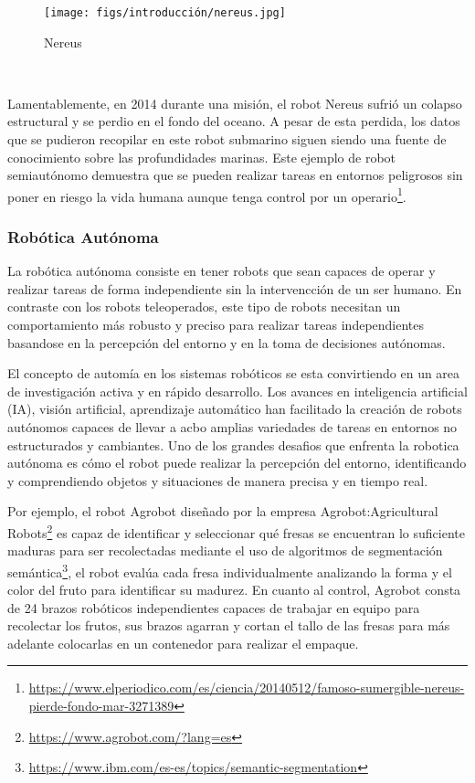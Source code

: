 \begin{figure} [H]
  \begin{center}
    \texttt{[image: figs/introducción/nereus.jpg]}
  \end{center}
  \caption{Nereus}
  \label{fig:Nereus}
\end{figure}\

Lamentablemente, en 2014 durante una misión, el robot Nereus sufrió un colapso estructural y se perdio en el fondo del oceano. A pesar de esta perdida, los datos que se pudieron
recopilar en este robot submarino siguen siendo una fuente de conocimiento sobre las profundidades marinas. Este ejemplo de robot semiautónomo demuestra que se pueden realizar 
tareas en entornos peligrosos sin poner en riesgo la vida humana aunque tenga control por un operario\footnote{\url{https://www.elperiodico.com/es/ciencia/20140512/famoso-sumergible-nereus-pierde-fondo-mar-3271389}}. 

\newpage
\subsubsection{Robótica Autónoma}
\label{sec:subseccion}

La robótica autónoma consiste en tener robots que sean capaces de operar y realizar tareas de forma independiente sin la intervencción de un ser humano. En contraste con los 
robots teleoperados, este tipo de robots necesitan un comportamiento más robusto y preciso para realizar tareas independientes basandose en la percepción del entorno 
y en la toma de decisiones autónomas. \newline

El concepto de automía en los sistemas robóticos se esta convirtiendo en un area de investigación activa y en rápido desarrollo. Los avances en inteligencia artificial (IA), visión 
artificial, aprendizaje automático han facilitado la creación de robots autónomos capaces de llevar a acbo amplias variedades de tareas en entornos no estructurados y cambiantes. 
Uno de los grandes desafios que enfrenta la robotica autónoma es cómo el robot puede realizar la percepción del entorno, identificando y comprendiendo objetos y situaciones de manera
precisa y en tiempo real. \newline

Por ejemplo, el robot Agrobot diseñado por la empresa Agrobot:Agricultural Robots\footnote{\url{https://www.agrobot.com/?lang=es}} es capaz de identificar
y seleccionar qué fresas se encuentran lo suficiente maduras para ser recolectadas mediante el uso de algoritmos de segmentación semántica\footnote{\url{https://www.ibm.com/es-es/topics/semantic-segmentation}}, el robot evalúa cada fresa individualmente
analizando la forma y el color del fruto para identificar su madurez. En cuanto al control, Agrobot consta de 24 brazos robóticos independientes capaces de trabajar en equipo para 
recolectar los frutos, sus brazos agarran y cortan el tallo de las fresas para más adelante colocarlas en un contenedor para realizar el empaque. 


